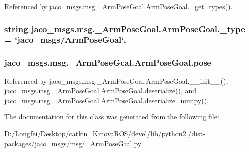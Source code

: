 Referenced by jaco\+\_\+msgs.\+msg.\+\_\+\+Arm\+Pose\+Goal.\+Arm\+Pose\+Goal.\+\_\+get\+\_\+types().

\subsubsection[{\texorpdfstring{\+\_\+type}{_type}}]{\setlength{\rightskip}{0pt plus 5cm}string jaco\+\_\+msgs.\+msg.\+\_\+\+Arm\+Pose\+Goal.\+Arm\+Pose\+Goal.\+\_\+type = \char`\"{}jaco\+\_\+msgs/{\bf Arm\+Pose\+Goal}\char`\"{}\hspace{0.3cm}{\ttfamily [static]}, {\ttfamily [private]}}\hypertarget{classjaco__msgs_1_1msg_1_1__ArmPoseGoal_1_1ArmPoseGoal_afbfdf7684d752624b8cd188832371e03}{}\label{classjaco__msgs_1_1msg_1_1__ArmPoseGoal_1_1ArmPoseGoal_afbfdf7684d752624b8cd188832371e03}
\subsubsection[{\texorpdfstring{pose}{pose}}]{\setlength{\rightskip}{0pt plus 5cm}jaco\+\_\+msgs.\+msg.\+\_\+\+Arm\+Pose\+Goal.\+Arm\+Pose\+Goal.\+pose}\hypertarget{classjaco__msgs_1_1msg_1_1__ArmPoseGoal_1_1ArmPoseGoal_ad25889b3ba293b0eba280014befdc9a6}{}\label{classjaco__msgs_1_1msg_1_1__ArmPoseGoal_1_1ArmPoseGoal_ad25889b3ba293b0eba280014befdc9a6}


Referenced by jaco\+\_\+msgs.\+msg.\+\_\+\+Arm\+Pose\+Goal.\+Arm\+Pose\+Goal.\+\_\+\+\_\+init\+\_\+\+\_\+(), jaco\+\_\+msgs.\+msg.\+\_\+\+Arm\+Pose\+Goal.\+Arm\+Pose\+Goal.\+deserialize(), and jaco\+\_\+msgs.\+msg.\+\_\+\+Arm\+Pose\+Goal.\+Arm\+Pose\+Goal.\+deserialize\+\_\+numpy().



The documentation for this class was generated from the following file\+:\begin{DoxyCompactItemize}
\item 
D\+:/\+Longfei/\+Desktop/catkin\+\_\+\+Kinova\+R\+O\+S/devel/lib/python2./dist-\/packages/jaco\+\_\+msgs/msg/\hyperlink{__ArmPoseGoal_8py}{\+\_\+\+Arm\+Pose\+Goal.\+py}\end{DoxyCompactItemize}
